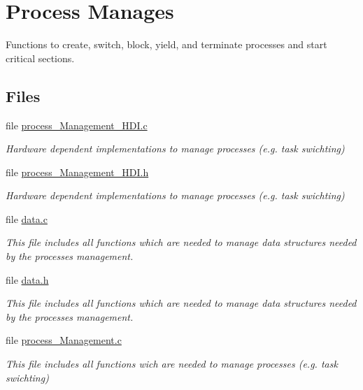 \hypertarget{group__process}{}\section{Process Manages}
\label{group__process}


Functions to create, switch, block, yield, and terminate processes and start critical sections.  


\subsection*{Files}
\begin{DoxyCompactItemize}
\item 
file \hyperlink{process__Management__HDI_8c}{process\+\_\+\+Management\+\_\+\+H\+D\+I.\+c}
\begin{DoxyCompactList}\small\item\em Hardware dependent implementations to manage processes (e.\+g. task swichting) \end{DoxyCompactList}\item 
file \hyperlink{process__Management__HDI_8h}{process\+\_\+\+Management\+\_\+\+H\+D\+I.\+h}
\begin{DoxyCompactList}\small\item\em Hardware dependent implementations to manage processes (e.\+g. task swichting) \end{DoxyCompactList}\item 
file \hyperlink{data_8c}{data.\+c}
\begin{DoxyCompactList}\small\item\em This file includes all functions which are needed to manage data structures needed by the processes management. \end{DoxyCompactList}\item 
file \hyperlink{data_8h}{data.\+h}
\begin{DoxyCompactList}\small\item\em This file includes all functions which are needed to manage data structures needed by the processes management. \end{DoxyCompactList}\item 
file \hyperlink{process__Management_8c}{process\+\_\+\+Management.\+c}
\begin{DoxyCompactList}\small\item\em This file includes all functions wich are needed to manage processes (e.\+g. task swichting) \end{DoxyCompactList}\item 

\end{DoxyCompactItemize}
